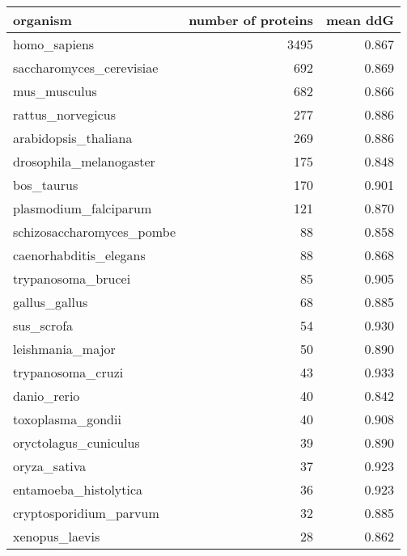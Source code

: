 \begin{tabular}{lrr}
\toprule
                       organism &  number of proteins &  mean ddG \\
\midrule
                   homo\_sapiens &                3495 &     0.867 \\
       saccharomyces\_cerevisiae &                 692 &     0.869 \\
                   mus\_musculus &                 682 &     0.866 \\
              rattus\_norvegicus &                 277 &     0.886 \\
           arabidopsis\_thaliana &                 269 &     0.886 \\
        drosophila\_melanogaster &                 175 &     0.848 \\
                     bos\_taurus &                 170 &     0.901 \\
          plasmodium\_falciparum &                 121 &     0.870 \\
      schizosaccharomyces\_pombe &                  88 &     0.858 \\
         caenorhabditis\_elegans &                  88 &     0.868 \\
             trypanosoma\_brucei &                  85 &     0.905 \\
                  gallus\_gallus &                  68 &     0.885 \\
                     sus\_scrofa &                  54 &     0.930 \\
               leishmania\_major &                  50 &     0.890 \\
              trypanosoma\_cruzi &                  43 &     0.933 \\
                    danio\_rerio &                  40 &     0.842 \\
              toxoplasma\_gondii &                  40 &     0.908 \\
          oryctolagus\_cuniculus &                  39 &     0.890 \\
                   oryza\_sativa &                  37 &     0.923 \\
          entamoeba\_histolytica &                  36 &     0.923 \\
         cryptosporidium\_parvum &                  32 &     0.885 \\
                 xenopus\_laevis &                  28 &     0.862 \\

\end{tabular}
